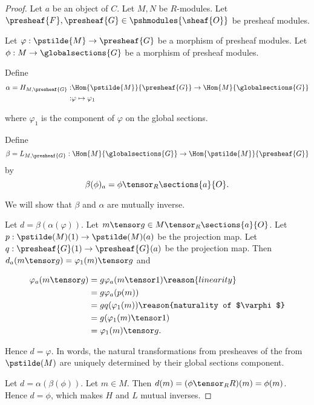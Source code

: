 
\begin{proof}
Let $a$ be an object of $C$.
Let $M,N$ be $R$-modules. 
Let $\presheaf{F},\presheaf{G} \in \pshmodules{\sheaf{O}}$ be presheaf modules.

Let $\varphi:\pstilde{M} \rightarrow \presheaf{G}$ be a morphism of presheaf modules.
Let $\phi: M \rightarrow \globalsections{G}$ be a morphism of presheaf modules.

Define
\begin{align}
\alpha = H_{M,\presheaf{G}} :& 
	\Hom{\pstilde{M}}{\presheaf{G}} \rightarrow \Hom{M}{\globalsections{G}} \\
	:& \varphi \mapsto \varphi_1
\end{align}

where $\varphi_1$ is the component of $\varphi$ on the global sections.

Define 
\[\beta = L_{M,\presheaf{G}}: 
	\Hom{M}{\globalsections{G}} \rightarrow \Hom{\pstilde{M}}{\presheaf{G}}
\] 
by
\[ \beta(\phi)_a = \phi \tensor_R \sections{a}{O}.\]

We will show that $\beta$ and $\alpha$ are mutually inverse. 

Let $d = \beta(\alpha(\varphi))$. 
Let $m \tensor g \in M \tensor_R \sections{a}{O}$.
Let $p: \pstilde(M)(1)\rightarrow \pstilde(M)(a)$ be the projection map.
Let $q: \presheaf{G}(1)\rightarrow \presheaf{G}(a)$ be the projection map.
Then $d_a(m \tensor g) = \varphi_1(m) \tensor g$
and

\begin{align*}
	\varphi_a(m \tensor g) &=  g \varphi_a(m \tensor 1) \reason{linearity}\\
		&= g \varphi_a(p(m)) \\
		&= g q(\varphi_1(m)) \reason{naturality of $\varphi$}\\
		&= g (\varphi_1(m) \tensor 1) \\
		&= \varphi_1(m) \tensor g.
\end{align*}

Hence $d = \varphi$. 
In words, the natural transformations from presheaves of the from $\pstilde(M)$ 
are uniquely determined by their global sections component.

Let $d = \alpha(\beta(\phi))$. 
Let $m \in M$.
Then $d(m) = (\phi \tensor_R R)(m) = \phi(m)$.
Hence $d = \phi$, which makes $H$ and $L$ mutual inverses.


\end{proof}
